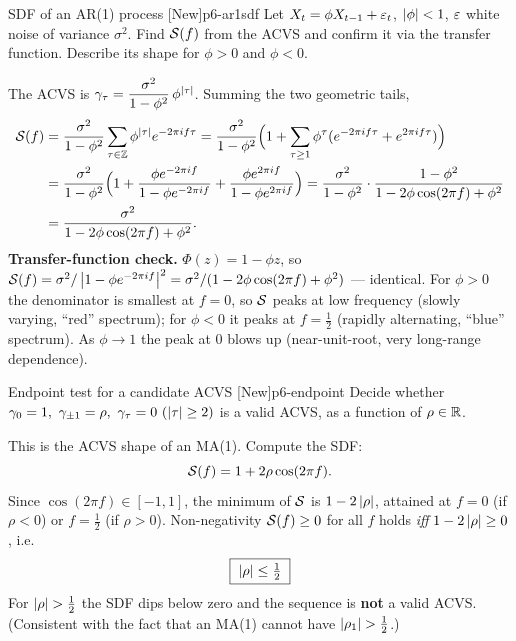 \begin{exercise}{SDF of an AR(1) process \quad\textnormal{[New]}}{p6-ar1sdf}
Let $X_t=\phi X_{t-1}+\varepsilon_t$, $\left\lvert \phi \right\rvert<1$, $\varepsilon$ white noise of variance
$\sigma^2$. Find $\mathcal{S}(f)$ from the ACVS and confirm it via the transfer
function. Describe its shape for $\phi>0$ and $\phi<0$.
\end{exercise}
\begin{solution}
The ACVS is $\gamma_\tau=\dfrac{\sigma^2}{1-\phi^2}\,\phi^{\left\lvert \tau \right\rvert}$. Summing the
two geometric tails,
\[
\begin{aligned}
\mathcal{S}(f)&=\frac{\sigma^2}{1-\phi^2}\sum_{\tau\in\mathbb{Z}}\phi^{\left\lvert \tau \right\rvert}e^{-2\pi i f\tau}
        =\frac{\sigma^2}{1-\phi^2}\Big(1+\sum_{\tau\ge1}\phi^\tau
         (e^{-2\pi i f\tau}+e^{2\pi i f\tau})\Big)\\
       &=\frac{\sigma^2}{1-\phi^2}\Big(1+\frac{\phi e^{-2\pi i f}}{1-\phi e^{-2\pi i f}}
         +\frac{\phi e^{2\pi i f}}{1-\phi e^{2\pi i f}}\Big)
        =\frac{\sigma^2}{1-\phi^2}\cdot\frac{1-\phi^2}
         {1-2\phi\cos(2\pi f)+\phi^2}\\
       &=\frac{\sigma^2}{1-2\phi\cos(2\pi f)+\phi^2}.
\end{aligned}
\]
\textbf{Transfer-function check.} $\Phi(z)=1-\phi z$, so
$\mathcal{S}(f)=\sigma^2/\left\lvert 1-\phi e^{-2\pi i f} \right\rvert^2
=\sigma^2/(1-2\phi\cos(2\pi f)+\phi^2)$ --- identical. For $\phi>0$ the
denominator is smallest at $f=0$, so $\mathcal{S}$ peaks at low frequency (slowly
varying, ``red'' spectrum); for $\phi<0$ it peaks at $f=\tfrac12$ (rapidly
alternating, ``blue'' spectrum). As $\phi\to1$ the peak at $0$ blows up
(near-unit-root, very long-range dependence).
\end{solution}

\begin{exercise}{Endpoint test for a candidate ACVS \quad\textnormal{[New]}}{p6-endpoint}
Decide whether $\acvs_0=1,\ \acvs_{\pm1}=\rho,\ \acvs_\tau=0\ (\abs\tau\ge2)$ is
a valid ACVS, as a function of $\rho\in\mathbb{R}$.
\end{exercise}
\begin{solution}
This is the ACVS shape of an MA(1). Compute the SDF:
\[
\mathcal{S}(f)=1+2\rho\cos(2\pi f).
\]
Since $\cos(2\pi f)\in[-1,1]$, the minimum of $\mathcal{S}$ is $1-2\left\lvert \rho \right\rvert$, attained
at $f=0$ (if $\rho<0$) or $f=\tfrac12$ (if $\rho>0$). Non-negativity
$\mathcal{S}(f)\ge0$ for all $f$ holds \emph{iff} $1-2\left\lvert \rho \right\rvert\ge0$, i.e.
\[
\boxed{\;\left\lvert \rho \right\rvert\le\tfrac12\;}
\]
For $\left\lvert \rho \right\rvert>\tfrac12$ the SDF dips below zero and the sequence is \textbf{not}
a valid ACVS. (Consistent with the fact that an MA(1) cannot have
$\left\lvert \rho_1 \right\rvert>\tfrac12$.)
\end{solution}

